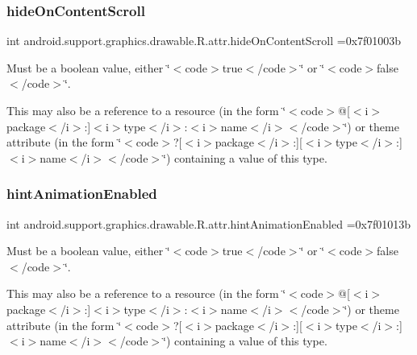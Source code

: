 \subsubsection{\texorpdfstring{hide\+On\+Content\+Scroll}{hideOnContentScroll}}
{\footnotesize\ttfamily int android.\+support.\+graphics.\+drawable.\+R.\+attr.\+hide\+On\+Content\+Scroll =0x7f01003b\hspace{0.3cm}{\ttfamily [static]}}

Must be a boolean value, either \char`\"{}$<$code$>$true$<$/code$>$\char`\"{} or \char`\"{}$<$code$>$false$<$/code$>$\char`\"{}. 

This may also be a reference to a resource (in the form \char`\"{}$<$code$>$@\mbox{[}$<$i$>$package$<$/i$>$\+:\mbox{]}$<$i$>$type$<$/i$>$\+:$<$i$>$name$<$/i$>$$<$/code$>$\char`\"{}) or theme attribute (in the form \char`\"{}$<$code$>$?\mbox{[}$<$i$>$package$<$/i$>$\+:\mbox{]}\mbox{[}$<$i$>$type$<$/i$>$\+:\mbox{]}$<$i$>$name$<$/i$>$$<$/code$>$\char`\"{}) containing a value of this type. \mbox{\label{classandroid_1_1support_1_1graphics_1_1drawable_1_1R_1_1attr_a96824c8d48c3017dd0562becfef4f048}} 
\subsubsection{\texorpdfstring{hint\+Animation\+Enabled}{hintAnimationEnabled}}
{\footnotesize\ttfamily int android.\+support.\+graphics.\+drawable.\+R.\+attr.\+hint\+Animation\+Enabled =0x7f01013b\hspace{0.3cm}{\ttfamily [static]}}

Must be a boolean value, either \char`\"{}$<$code$>$true$<$/code$>$\char`\"{} or \char`\"{}$<$code$>$false$<$/code$>$\char`\"{}. 

This may also be a reference to a resource (in the form \char`\"{}$<$code$>$@\mbox{[}$<$i$>$package$<$/i$>$\+:\mbox{]}$<$i$>$type$<$/i$>$\+:$<$i$>$name$<$/i$>$$<$/code$>$\char`\"{}) or theme attribute (in the form \char`\"{}$<$code$>$?\mbox{[}$<$i$>$package$<$/i$>$\+:\mbox{]}\mbox{[}$<$i$>$type$<$/i$>$\+:\mbox{]}$<$i$>$name$<$/i$>$$<$/code$>$\char`\"{}) containing a value of this type. \mbox{\label{classandroid_1_1support_1_1graphics_1_1drawable_1_1R_1_1attr_a5b62ec915ece6a81f6f874588ef73c43}} 
